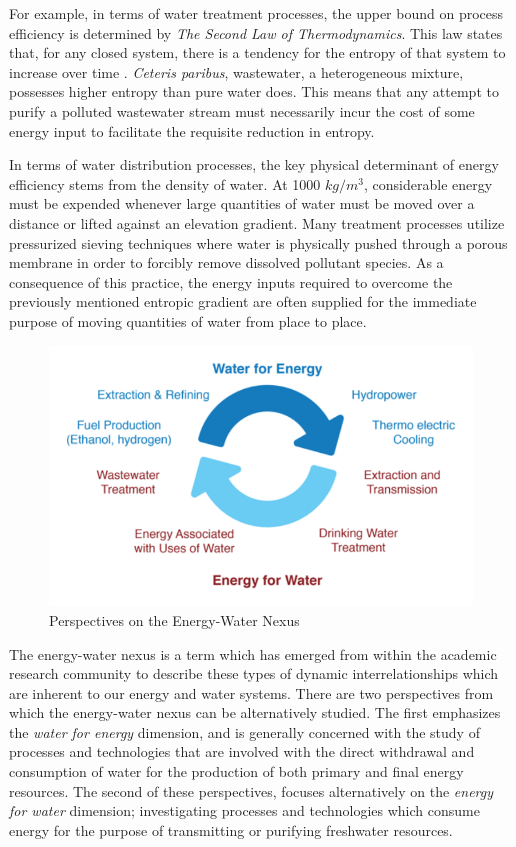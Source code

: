 For example, in terms of water treatment processes, the upper bound on process efficiency is determined by \textit{The Second Law of Thermodynamics}. This law states that, for any closed system, there is a tendency for the entropy of that system to increase over time \cite{Jaynes1996}. \textit{Ceteris paribus}, wastewater, a heterogeneous mixture, possesses higher entropy than pure water does. This means that any attempt to purify a polluted wastewater stream must necessarily incur the cost of some energy input to facilitate the requisite reduction in entropy. 
    
In terms of water distribution processes, the key physical determinant of energy efficiency stems from the density of water. At 1000 $kg/m^3$, considerable energy must be expended whenever large quantities of water must be moved over a distance or lifted against an elevation gradient. Many treatment processes utilize pressurized sieving techniques where water is physically pushed through a porous membrane in order to forcibly remove dissolved pollutant species. As a consequence of this practice, the energy inputs required to overcome the previously mentioned entropic gradient are often supplied for the immediate purpose of moving quantities of water from place to place.
    
     \begin{figure}[!h]
       \centering
       \includegraphics[width=4.5in]{figures/energy-water-nexus-perspectives.png}
       \caption[Perspectives on the Energy-Water Nexus]{Perspectives on the Energy-Water Nexus \cite{Pate2007}}
       \label{fig:energy-water-perspectives}
     \end{figure}
     
The energy-water nexus is a term which has emerged from within the academic research community to describe these types of dynamic interrelationships which are inherent to our energy and water systems. There are two perspectives from which the energy-water nexus can be alternatively studied. The first emphasizes the \textit{water for energy} dimension, and is generally concerned with the study of processes and technologies that are involved with the direct withdrawal and consumption of water for the production of both primary and final energy resources. The second of these perspectives, focuses alternatively on the \textit{energy for water} dimension; investigating processes and technologies which consume energy for the purpose of transmitting or purifying freshwater resources. 
    
